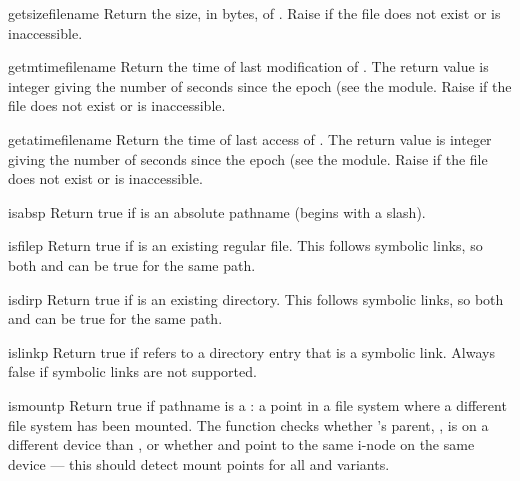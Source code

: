 \begin{funcdesc}{getsize}{filename}
Return the size, in bytes, of .  Raise
 if the file does not exist or is inaccessible.
\end{funcdesc}

\begin{funcdesc}{getmtime}{filename}
Return the time of last modification of .  The return
value is integer giving the number of seconds since the epoch (see the 
 module.  Raise  if the file does not
exist or is inaccessible.
\end{funcdesc}

\begin{funcdesc}{getatime}{filename}
Return the time of last access of .  The return
value is integer giving the number of seconds since the epoch (see the 
 module.  Raise  if the file does not
exist or is inaccessible.
\end{funcdesc}

\begin{funcdesc}{isabs}{p}
Return true if  is an absolute pathname (begins with a slash).
\end{funcdesc}

\begin{funcdesc}{isfile}{p}
Return true if  is an existing regular file.  This follows
symbolic links, so both  and 
can be true for the same path.
\end{funcdesc}

\begin{funcdesc}{isdir}{p}
Return true if  is an existing directory.  This follows
symbolic links, so both  and  can
be true for the same path.
\end{funcdesc}

\begin{funcdesc}{islink}{p}
Return true if
refers to a directory entry that is a symbolic link.
Always false if symbolic links are not supported.
\end{funcdesc}

\begin{funcdesc}{ismount}{p}
Return true if pathname  is a : a point in a
file system where a different file system has been mounted.  The
function checks whether 's parent, , is on a
different device than , or whether  and
 point to the same i-node on the same device --- this should
detect mount points for all \UNIX{} and \POSIX{} variants.
\end{funcdesc}

